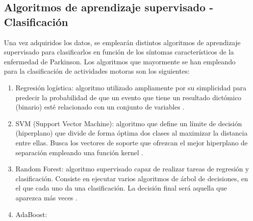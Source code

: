 \subsection{Algoritmos de aprendizaje supervisado - Clasificación}

Una vez adquiridos los datos, se emplearán distintos algoritmos de aprendizaje supervisado para clasificarlos en función de los síntomas característicos de la enfermedad de Parkinson.
Los algoritmos que mayormente se han empleando para la clasificación de actividades motoras son los siguientes:

\begin{enumerate}
    \item Regresión logística: algoritmo utilizado ampliamente por su simplicidad para predecir la probabilidad de que un evento que tiene un resultado dictómico (binario) esté relacionado con un conjunto de variables \cite{muniz2010comparison}. 
    \item SVM (Support Vector Machine): algoritmo que define un límite de decisión (hiperplano) que divide de forma óptima dos clases al maximizar la distancia entre ellas.  Busca los vectores de soporte  que ofrezcan el mejor hiperplano de separación empleando una función kernel \cite{bourouhou2016comparison}.
    \item Random Forest: algoritmo supervisado capaz de realizar tareas de regresión y clasificación. Consiste en ejecutar varios algoritmos de árbol de decisiones, en el que cada uno da una clasificación. La decisión final será aquella que aparezca más veces \cite{liaw2002classification}.
	\item AdaBoost:
\end{enumerate}


